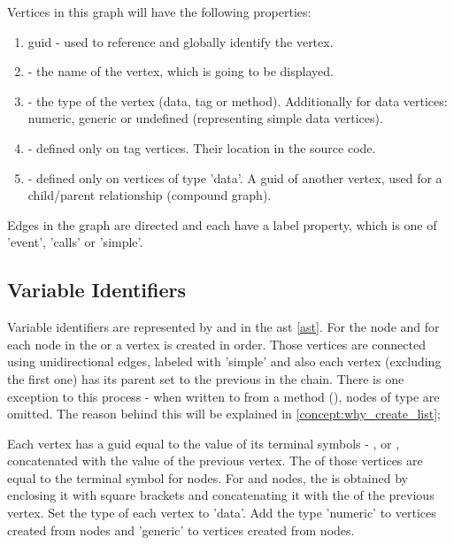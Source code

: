 Vertices in this graph will have the following properties:
\label{concept:interaction_diagram_structure}
\begin{enumerate}
    \item \gls{guid} - used to reference and globally identify the vertex.
    \item {} - the name of the vertex, which is going to be displayed.
    \item {} - the type of the vertex (data, tag or method). Additionally for data vertices: numeric, generic or undefined (representing simple data vertices).
    \item {} - defined only on tag vertices. Their location in the source code.
    \item {} - defined only on vertices of type 'data'. A \gls{guid} of another vertex, used for a child/parent relationship (compound graph).
\end{enumerate}

Edges in the graph are directed and each have a label property, which is one of 'event', 'calls' or 'simple'. 

\subsection{Variable Identifiers}
\label{concept:variable_identifiers}
Variable identifiers are represented by  and  in the \gls{ast} \ref{ast}. For the  node and for each  node in the  or  a vertex is created in order. 
Those vertices are connected using unidirectional edges, labeled with 'simple' and also each vertex (excluding the first one) has its parent set to the previous in the chain. There is one exception to this process - when written to from a method (), nodes of type  are omitted. The reason behind this will be explained in \ref{concept:why_create_list};

Each vertex has a \gls{guid} equal to the value of its terminal symbols - ,  or , concatenated with the value of the previous vertex.
The  of those vertices are equal to the terminal symbol for  nodes. For  and  nodes, the  is obtained by enclosing it with square brackets and concatenating it with the  of the previous vertex. Set the type of each vertex to 'data'. Add the type 'numeric' to vertices created from  nodes and 'generic' to vertices created from  nodes. 

